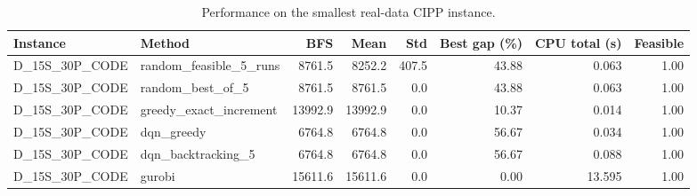 \begin{table}[t]
\centering
\caption{Performance on the smallest real-data CIPP instance.}
\begin{tabular}{llrrrrrr}
\toprule
Instance & Method & BFS & Mean & Std & Best gap (\%) & CPU total (s) & Feasible \\
\midrule
D\_15S\_30P\_CODE & random\_feasible\_5\_runs & 8761.5 & 8252.2 & 407.5 & 43.88 & 0.063 & 1.00 \\
D\_15S\_30P\_CODE & random\_best\_of\_5 & 8761.5 & 8761.5 & 0.0 & 43.88 & 0.063 & 1.00 \\
D\_15S\_30P\_CODE & greedy\_exact\_increment & 13992.9 & 13992.9 & 0.0 & 10.37 & 0.014 & 1.00 \\
D\_15S\_30P\_CODE & dqn\_greedy & 6764.8 & 6764.8 & 0.0 & 56.67 & 0.034 & 1.00 \\
D\_15S\_30P\_CODE & dqn\_backtracking\_5 & 6764.8 & 6764.8 & 0.0 & 56.67 & 0.088 & 1.00 \\
D\_15S\_30P\_CODE & gurobi & 15611.6 & 15611.6 & 0.0 & 0.00 & 13.595 & 1.00 \\
\bottomrule
\end{tabular}
\end{table}
